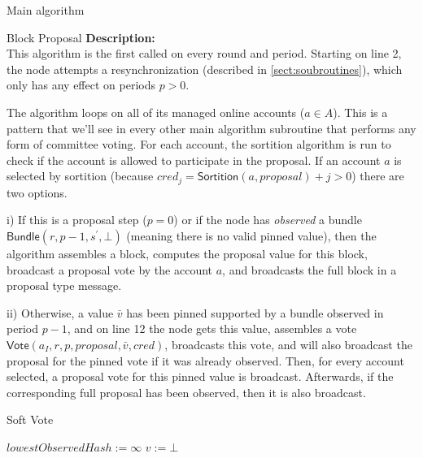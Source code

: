 \documentclass[10pt,a4paper]{article}
\begin{document}
\begin{section}{Main algorithm}
\begin{subsection}{Block Proposal}
\newpage
\noindent \textbf{Description:}\\
This algorithm is the first called on every round and period. 
Starting on line 2, the node attempts a resynchronization (described in \ref{sect:soubroutines}), which
only has any effect on periods $p > 0$.

The algorithm loops on all of its managed online accounts ($a\in A$). 
This is a pattern that we'll see in every other main algorithm subroutine 
that performs any form of committee voting.
For each account, the sortition algorithm is run to check if the account is allowed 
to participate in the proposal. 
If an account $a$ is selected by sortition (because $cred_j=\mathsf{Sortition}(a, proposal)+j>0$)
there are two options. 

i) If this is a proposal step ($p=0$) or if the node has {\em observed} a bundle 
$\mathsf{Bundle}(r, p-1, s^\prime, \bot)$ (meaning there is no valid pinned value), 
then the algorithm assembles a block, computes the proposal value for this block, 
broadcast a proposal vote by the account $a$, and broadcasts the full block in a 
proposal type message.

ii) Otherwise, a value $\bar v$ has been pinned supported by a bundle observed in 
period $p-1$, and on line 12 the node gets this value, assembles a vote
$\mathsf{Vote}(a_I, r, p, proposal, \bar{v}, cred)$, broadcasts this vote,
and will also broadcast the proposal for the pinned vote if it was already
observed.
%
Then, for every account selected, a proposal vote for this pinned value is broadcast. Afterwards, 
if the corresponding full proposal has been observed, then it is also broadcast.


\end{subsection}
\begin{subsection}{Soft Vote}\label{ssect:softvote}

\begin{algorithm}[H]
    \caption{\underline{Soft Vote}}
    \label{algo:soft-vote}
    \begin{algorithmic}[1]
    \State $lowestObservedHash := \infty$
    \State $v := \bot$ 


\end{algorithmic}
\end{algorithm}
\end{subsection}
\end{section}
\end{document}
